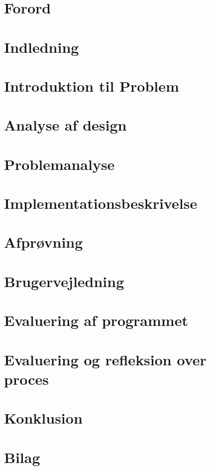 



	\tableofcontents* %
	\newpage

	\chapter{Forord}
	

	\chapter{Indledning}
	

	\chapter{Introduktion til Problem}
	

	\chapter{Analyse af design}
	

	\chapter{Problemanalyse}
	

	\chapter{Implementationsbeskrivelse}
	

	\chapter{Afprøvning}
	

	\chapter{Brugervejledning}
	

	\chapter{Evaluering af programmet}
	

	\chapter{Evaluering og refleksion over proces}
	

	\chapter{Konklusion}
	

	\chapter{Bilag}
	


